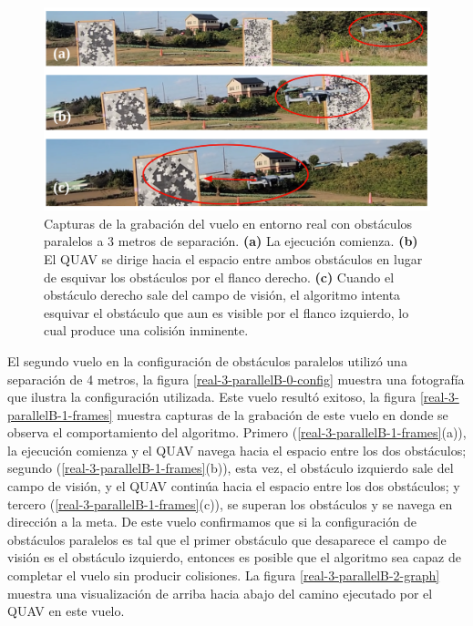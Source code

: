 \begin{figure}[H]
    \centering
    \includegraphics[scale=0.25]{partes/img/real-2-parallelA-1-frames.png}
    \caption[Capturas de la grabación del vuelo en entorno real con obstáculos paralelos a 3 metros de separación.]{Capturas de la grabación del vuelo en entorno real con obstáculos paralelos a 3 metros de separación. \textbf{(a)} La ejecución comienza. \textbf{(b)} El QUAV se dirige hacia el espacio entre ambos obstáculos en lugar de esquivar los obstáculos por el flanco derecho. \textbf{(c)} Cuando el obstáculo derecho sale del campo de visión, el algoritmo intenta esquivar el obstáculo que aun es visible por el flanco izquierdo, lo cual produce una colisión inminente.}
    \label{real-2-parallelA-1-frames}
\end{figure}

El segundo vuelo en la configuración de obstáculos paralelos utilizó una separación de 4 metros, la figura \ref{real-3-parallelB-0-config} muestra una fotografía que ilustra la configuración utilizada. Este vuelo resultó exitoso, la figura \ref{real-3-parallelB-1-frames} muestra capturas de la grabación de este vuelo en donde se observa el comportamiento del algoritmo. Primero (\ref{real-3-parallelB-1-frames}(a)), la ejecución comienza y el QUAV navega hacia el espacio entre los dos obstáculos; segundo (\ref{real-3-parallelB-1-frames}(b)), esta vez, el obstáculo izquierdo sale del campo de visión, y el QUAV continúa hacia el espacio entre los dos obstáculos; y tercero (\ref{real-3-parallelB-1-frames}(c)), se superan los obstáculos y se navega en dirección a la meta. De este vuelo confirmamos que si la configuración de obstáculos paralelos es tal que el primer obstáculo que desaparece el campo de visión es el obstáculo izquierdo, entonces es posible que el algoritmo sea capaz de completar el vuelo sin producir colisiones. La figura \ref{real-3-parallelB-2-graph} muestra una visualización de arriba hacia abajo del camino ejecutado por el QUAV en este vuelo.

